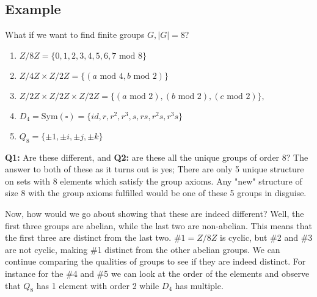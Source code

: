 \documentclass[12pt]{article}
\begin{document}
\subsection*{Example} 
What if we want to find finite groups \(G, |G| = 8\)? 
\begin{enumerate}
    \item \(Z/8Z = \{0,1,2,3,4,5,6,7 \text{ mod } 8\}\) 
    \item \(Z/4Z \times Z/2Z = \{(a \text{ mod } 4, b \text{ mod } 2)\}\)
    \item \(Z/2Z \times Z/2Z \times Z/2Z =
    \{(a \text{ mod } 2),(b \text{ mod } 2),(c \text{ mod } 2)\},\)
    \item \(D_4 = \text{Sym}(\square) = \{id, r, r^2, r^3, s, rs, r^2s, r^3s\}\)
    \item \(Q_8 = \{\pm 1, \pm i, \pm j, \pm k\}\)
\end{enumerate}

\noindent 
\textbf{Q1:} Are these different, 
and \textbf{Q2:} are these all the unique groups of order 8?
The answer to both of these as it turns out is yes; 
There are only 5 unique structure on sets with 8 elements which 
satisfy the group axioms. Any "new" structure of size 8 with the group axioms fulfilled
would be one of these 5 groups in disguise. 

\noindent 
Now, how would we go about showing that these are indeed different? 
Well, the first three groups are abelian, while the last two are non-abelian. 
This means that the first three are distinct from the last two. 
\(\#1 = Z/8Z\) is cyclic, but \#2 and \#3 are not cyclic, 
making \#1 distinct from the other abelian groups. 
We can continue comparing the qualities of groups to see if they are indeed distinct. 
For instance for the \#4 and \#5 we can look at the order of the elements 
and observe that \(Q_8\) has 1 element with order 2 while \(D_4\) has multiple.  
\end{document}
